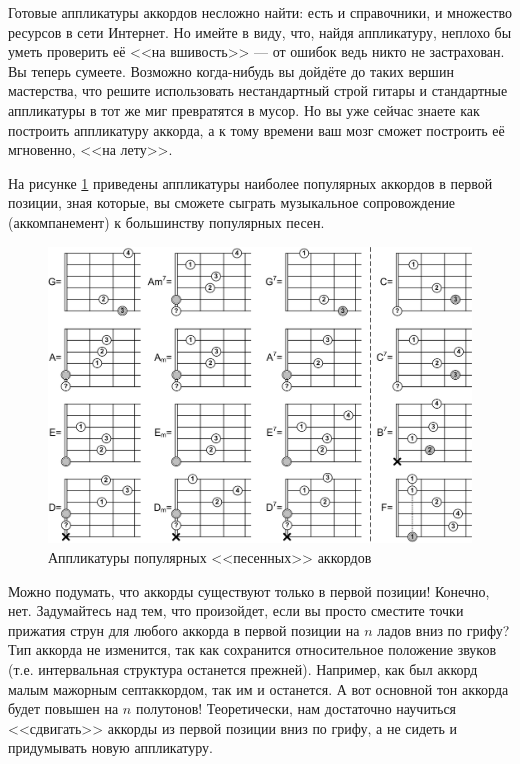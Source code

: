 Готовые аппликатуры аккордов несложно найти: есть и справочники, и множество ресурсов в сети Интернет. Но имейте в виду, что, найдя аппликатуру, неплохо бы уметь проверить её <<на вшивость>> --- от ошибок ведь никто не застрахован. Вы теперь сумеете. Возможно когда-нибудь вы дойдёте до таких вершин мастерства, что решите использовать нестандартный строй гитары и стандартные аппликатуры в тот же миг превратятся в мусор. Но вы уже сейчас знаете как построить аппликатуру аккорда, а к тому времени ваш мозг сможет построить её мгновенно, <<на лету>>.

На рисунке \ref{fig:harmony:chords:popular} приведены аппликатуры наиболее популярных аккордов в первой позиции, зная которые, вы сможете сыграть музыкальное сопровождение (аккомпанемент) к большинству популярных песен.

\begin{figure}[!ht]
    \centering
    \includegraphics{fig/chords/popular} 
    \caption{Аппликатуры популярных <<песенных>> аккордов}\label{fig:harmony:chords:popular}
\end{figure} 

Можно подумать, что аккорды существуют только в первой позиции! Конечно, нет. Задумайтесь над тем, что произойдет, если вы просто сместите точки прижатия струн для любого аккорда в первой позиции на $n$ ладов вниз по грифу? Тип аккорда не изменится, так как сохранится относительное положение звуков (т.е. интервальная структура останется прежней). Например, как был аккорд малым мажорным септаккордом, так им и останется. А вот основной тон аккорда будет повышен на $n$ полутонов! Теоретически, нам достаточно научиться <<сдвигать>> аккорды из первой позиции вниз по грифу, а не сидеть и придумывать новую аппликатуру.

